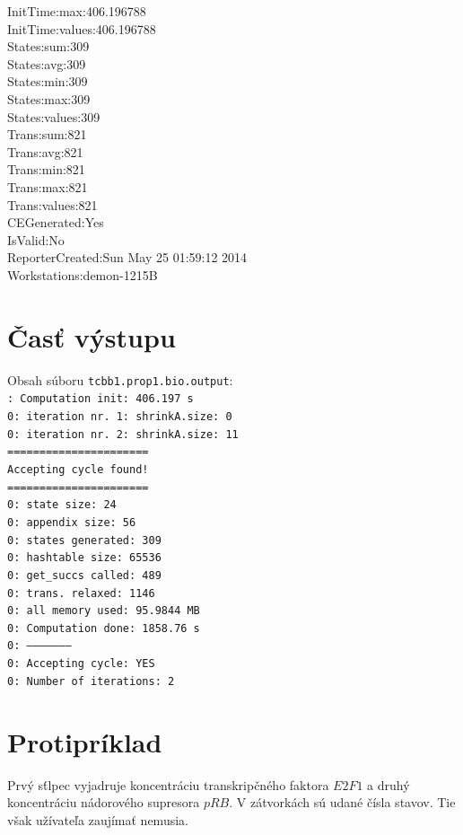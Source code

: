 \documentclass[11pt,final,oneside]{fithesis}
\begin{document}
{InitTime:max:406.196788\\
InitTime:values:406.196788\\
States:sum:309\\
States:avg:309\\
States:min:309\\
States:max:309\\
States:values:309\\
Trans:sum:821\\
Trans:avg:821\\
Trans:min:821\\
Trans:max:821\\
Trans:values:821\\
CEGenerated:Yes\\
IsValid:No\\
ReporterCreated:Sun May 25 01:59:12 2014\\
Workstations:demon-1215B\\
}

\section{\v Cas\v t v\'ystupu}
\label{sec:prop1output}
Obsah s\'uboru {\tt tcbb1.prop1.bio.output}:\\

{\tt{}: Computation init:  406.197 s\\
0: iteration nr. 1: shrinkA.size: 0\\
0: iteration nr. 2: shrinkA.size: 11\\
======================\\
Accepting cycle found!\\
======================\\
 0: state size:		24\\
 0: appendix size:	56\\
 0: states generated:	309\\
 0: hashtable size:	65536\\
 0: get\_succs called:	489\\
 0: trans. relaxed:	1146\\
 0: all memory used:	95.9844 MB\\
 0: Computation done:	1858.76 s\\
 0: --------------------\\
 0: Accepting cycle:	YES\\
 0: Number of iterations:	2\\
}

\section{Protipr\'iklad}
\label{sec:prop1trail}
Prv\'y s\'tlpec vyjadruje koncentr\'aciu transkrip\v cn\'eho faktora $E2F1$ a druh\'y koncentr\'aciu n\'adorov\'eho supresora $pRB$. V z\'atvork\'ach s\'u 
udan\'e \v c\'isla stavov. Tie v\v sak u\v z\'ivate\v la zauj\'ima\v t nemusia.\\
\end{document}
